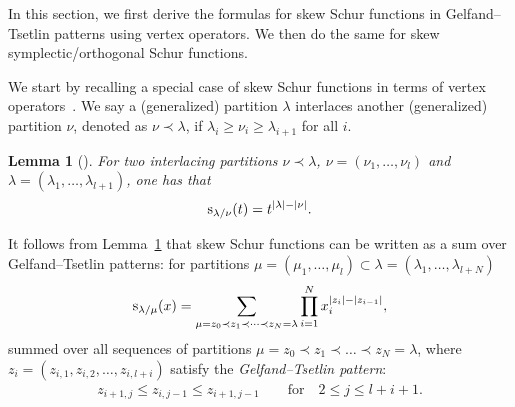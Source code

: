 \documentclass[10pt,a4paper]{amsart}
\numberwithin{equation}{section}
\newtheorem{Lemma}[Theorem]{Lemma}
\begin{document}
In this section, we first derive the formulas for skew Schur functions in Gelfand--Tsetlin patterns using vertex operators. We then do the same for
skew symplectic/orthogonal Schur functions.

We start by recalling a special case of skew Schur functions in terms of vertex operators~\mbox{\cite[Proposition~2.4]{JL2020}}. We say a (generalized) partition
$\lambda$ interlaces another (generalized) partition $\nu$, denoted as $\nu\prec\lambda$, if $\lambda_{i}\ge\nu_{i}\geq\lambda_{i+1}$ for all $i$.
\begin{Lemma}[{\cite[p.~72]{Mac1995}}]\label{le3} For two interlacing partitions $\nu\prec\lambda$, $\nu=(\nu_{1},\dots,\nu_{l})$ and $\lambda=(\lambda_{1},\dots,\lambda_{l+1})$, one has that
\begin{align*}
{\rm s}_{\lambda/\nu}(t)=t^{|\lambda|-|\nu|}.
\end{align*}
\end{Lemma}
It follows from Lemma~\ref{le3} that skew Schur functions can be written as a sum over Gelfand--Tsetlin patterns: for partitions $\mu=(\mu_1,\dots,\mu_l)\subset \lambda=(\lambda_1,\dots,\lambda_{l+N})$
\begin{align*}
{\rm s}_{\lambda/\mu}(x)=\sum_{\mu=z_0\prec z_1\prec\dots\prec z_N=\lambda}\prod^N_{i=1}x^{|z_i|-|z_{i-1}|}_i,
\end{align*}
summed over all sequences of partitions $\mu=z_0\prec z_1\prec\dots\prec z_N=\lambda$, where
$z_i=(z_{i,1},z_{i,2},\dots,\allowbreak z_{i,l+i})$ satisfy
 the {\it Gelfand--Tsetlin pattern}:
\begin{align*}
z_{i+1,j}\leq z_{i,j-1}\leq z_{i+1,j-1}\qquad \text{for}\quad 2\leq j\leq l+i+1.
\end{align*}
\end{document}
